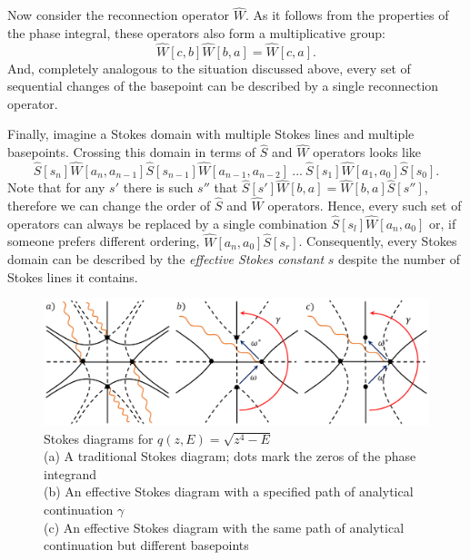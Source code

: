 \documentclass[atmp]{ipart_v1}
\def\S{\widehat{S}}
\def\W{\widehat{W}}
\begin{document}
Now consider the reconnection operator $\W$. As it follows from the properties of the phase integral, 
these operators also form a multiplicative group:
\begin{equation}
\W[c,b]\W[b,a] = \W[c,a].
\end{equation}
And, completely analogous to the situation discussed above, every set of sequential changes of the basepoint
can be described by a single reconnection operator.

Finally, imagine a Stokes domain with multiple Stokes lines and multiple basepoints. Crossing this 
domain in terms of $\S$ and $\W$ operators looks like
\begin{equation}
\S[s_n]\W[a_n,a_{n-1}]\S[s_{n-1}]\W[a_{n-1},a_{n-2}]\ ...\ \S[s_1]\W[a_1,a_0]\S[s_0].
\end{equation}
Note that for any $s'$ there is such $s''$ that $\S[s']\W[b,a]=\W[b,a]\S[s'']$, therefore
we can change the order of $\S$ and $\W$ operators. Hence,
every such set of operators can always be replaced by a single combination $\S[s_l] \W[a_n,a_0]$ or, 
if someone prefers different ordering, $\W[a_n,a_0] \S[s_r]$. Consequently, every Stokes domain can 
be described by the \textit{effective Stokes constant} $s$ despite the number of Stokes lines it contains. 

\begin{figure}
\centering
\noindent
\includegraphics[width=\textwidth]{stuff/effsd_1.png}
\caption{
Stokes diagrams for $q(z,E)=\sqrt{z^4-E}$
\\
(a) A traditional Stokes diagram; dots mark the zeros of the phase integrand
\\
(b) An effective Stokes diagram with a specified path of analytical continuation $\gamma$
\\
(c) An effective Stokes diagram with the same path of analytical continuation but different basepoints}
\label{fig:effsd_1}
\end{figure} 
\end{document}
